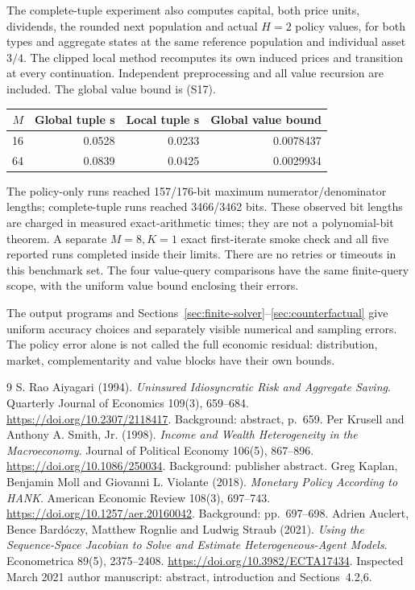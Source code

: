 \documentclass[11pt,a4paper]{article}
\begin{document}
The complete-tuple experiment also computes capital, both price units,
dividends, the rounded next population and actual $H=2$ policy values,
for both types and aggregate states at the same reference population and
individual asset $3/4$. The clipped local method recomputes its own induced
prices and transition at every continuation. Independent preprocessing
and all value recursion are included. The global value bound is \textup{(S17)}.
\begin{center}\small
\begin{tabular}{r|rr|r}
$M$ & Global tuple s & Local tuple s & Global value bound\\\hline
16 & 0.0528 & 0.0233 & 0.0078437 \\
64 & 0.0839 & 0.0425 & 0.0029934 \\
\end{tabular}
\end{center}
The policy-only runs reached 157/176-bit maximum numerator/denominator
lengths; complete-tuple runs reached 3466/3462 bits. These observed bit lengths
are charged in measured exact-arithmetic times; they are not a polynomial-bit
theorem. A separate $M=8,K=1$ exact first-iterate smoke check and all five
reported runs completed inside their limits. There are no retries or timeouts
in this benchmark set. The four value-query comparisons have the same
finite-query scope, with the uniform value bound enclosing their errors.

The output programs and Sections~\ref{sec:finite-solver}--\ref{sec:counterfactual}
give uniform accuracy choices and separately visible numerical and sampling
errors. The policy error alone is not called the full economic residual:
distribution, market, complementarity and value blocks have their own bounds.

\begin{thebibliography}{9}
 S. Rao Aiyagari (1994).
\emph{Uninsured Idiosyncratic Risk and Aggregate Saving}.
Quarterly Journal of Economics 109(3), 659--684.
\url{https://doi.org/10.2307/2118417}. Background: abstract, p.~659.
 Per Krusell and Anthony A. Smith, Jr. (1998).
\emph{Income and Wealth Heterogeneity in the Macroeconomy}.
Journal of Political Economy 106(5), 867--896.
\url{https://doi.org/10.1086/250034}. Background: publisher abstract.
 Greg Kaplan, Benjamin Moll and Giovanni L. Violante (2018).
\emph{Monetary Policy According to HANK}.
American Economic Review 108(3), 697--743.
\url{https://doi.org/10.1257/aer.20160042}. Background: pp.~697--698.
 Adrien Auclert, Bence Bard\'oczy, Matthew Rognlie and Ludwig Straub (2021).
\emph{Using the Sequence-Space Jacobian to Solve and Estimate Heterogeneous-Agent Models}.
Econometrica 89(5), 2375--2408. \url{https://doi.org/10.3982/ECTA17434}.
Inspected March 2021 author manuscript: abstract, introduction and Sections~4.2,6.
\end{thebibliography}
\end{document}
